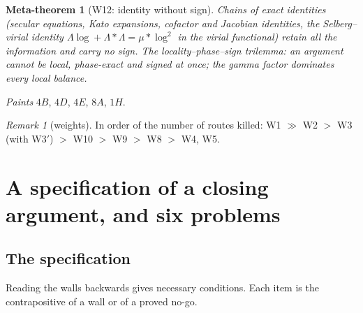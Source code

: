 \documentclass[11pt]{amsart}
\newtheorem{metatheorem}[theorem]{Meta-theorem}
\theoremstyle{definition}
\theoremstyle{remark}
\newtheorem{remark}[theorem]{Remark}
\begin{document}
\begin{metatheorem}[W12: identity without sign]\label{W12}
Chains of exact identities (secular equations, Kato expansions, cofactor and Jacobian identities, the
Selberg--virial identity $\Lambda\log+\Lambda*\Lambda=\mu*\log^2$ in the virial functional) retain all the
information and carry no sign. The locality--phase--sign trilemma: an argument cannot be local, phase-exact
and signed at once; the gamma factor dominates every local balance.
\end{metatheorem}
\noindent \emph{Paints} $4B$, $4D$, $4E$, $8A$, $1H$.

\begin{remark}[weights]
In order of the number of routes killed: W1 $\gg$ W2 $>$ W3 (with W3$'$) $>$ W10 $>$ W9 $>$ W8 $>$ W4, W5.
\end{remark}

\section{A specification of a closing argument, and six problems}\label{sec:spec}

\subsection{The specification}
Reading the walls backwards gives necessary conditions. Each item is the contrapositive of a wall or of a
proved no-go.
\end{document}
